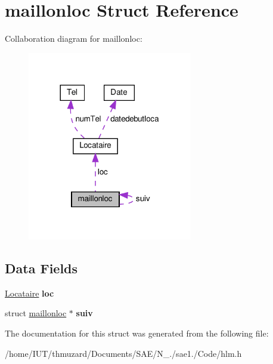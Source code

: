 \hypertarget{structmaillonloc}{}\section{maillonloc Struct Reference}
\label{structmaillonloc}


Collaboration diagram for maillonloc\+:
\nopagebreak
\begin{figure}[H]
\begin{center}
\leavevmode
\includegraphics[width=204pt]{structmaillonloc__coll__graph}
\end{center}
\end{figure}
\subsection*{Data Fields}
\begin{DoxyCompactItemize}
\item 
\mbox{\label{structmaillonloc_a93f86743307f08fbd6581318e23c0342}} 
\hyperlink{struct_locataire}{Locataire} {\bfseries loc}
\item 
\mbox{\label{structmaillonloc_a324f811e85c0a337dbc0ad4968d4d068}} 
struct \hyperlink{structmaillonloc}{maillonloc} $\ast$ {\bfseries suiv}
\end{DoxyCompactItemize}


The documentation for this struct was generated from the following file\+:\begin{DoxyCompactItemize}
\item 
/home/\+I\+U\+T/thmuzard/\+Documents/\+S\+A\+E/\+N\+\_./sae1./\+Code/hlm.\+h\end{DoxyCompactItemize}
